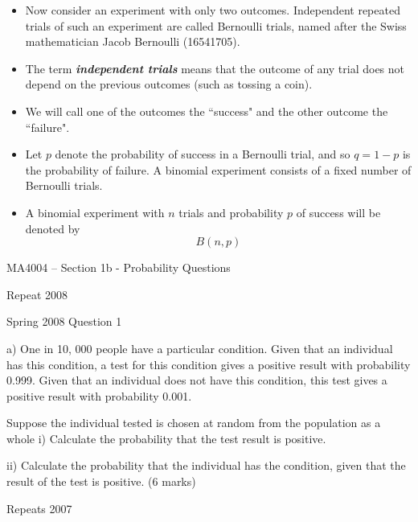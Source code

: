 \documentclass[12pt]{report}
\begin{document}
		
		
		\begin{itemize}
			\item Now consider an experiment with only two outcomes. Independent repeated trials of such an experiment are
			called Bernoulli trials, named after the Swiss mathematician Jacob Bernoulli (16541705). \item The term \textbf{\emph{independent
					trials}} means that the outcome of any trial does not depend on the previous outcomes (such as tossing a coin).
			\item We will call one of the outcomes the ``success" and the other outcome the ``failure".
		\end{itemize}
		
		
		
		\begin{itemize} \item
			Let $p$ denote the probability of success in a Bernoulli trial, and so $q = 1 - p$ is the probability of failure.
			A binomial experiment consists of a fixed number of Bernoulli trials. \item A binomial experiment with $n$ trials and
			probability $p$ of success will be denoted by
			\[B(n, p)\]
		\end{itemize}
		
 
 MA4004 – Section 1b - Probability Questions
 
 Repeat 2008
 
 Spring 2008
 Question 1
 
 a)   One in 10, 000 people have a particular condition. Given that an individual has this condition, a test for this condition gives a positive result with probability 0.999. Given that an individual does not have this condition, this test gives a positive result with probability 0.001.
 
 Suppose the individual tested is chosen at random from the population as a whole
 i)                  Calculate the probability that the test result is positive.
 
 ii)                Calculate the probability that the individual has the condition, given that the result of the test is positive.
 (6 marks)
 
 Repeats 2007
 
\end{document}
